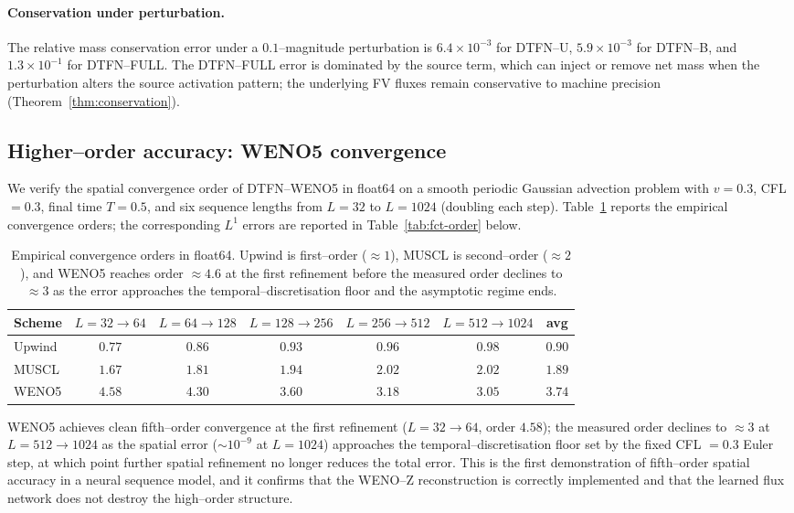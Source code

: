\documentclass[10pt]{article}
\theoremstyle{definition}
\theoremstyle{remark}
\begin{document}
\paragraph{Conservation under perturbation.}  The relative mass
conservation error under a $0.1$--magnitude perturbation is
$6.4 \times 10^{-3}$ for DTFN--U, $5.9 \times 10^{-3}$ for DTFN--B,
and $1.3 \times 10^{-1}$ for DTFN--FULL.  The DTFN--FULL error is
dominated by the source term, which can inject or remove net mass
when the perturbation alters the source activation pattern; the
underlying FV fluxes remain conservative to machine precision
(Theorem~\ref{thm:conservation}).

\subsection{Higher--order accuracy: WENO5 convergence}
\label{sec:exp-weno5}

We verify the spatial convergence order of DTFN--WENO5 in float64 on a
smooth periodic Gaussian advection problem with $v = 0.3$, CFL
$= 0.3$, final time $T = 0.5$, and six sequence lengths from
$L=32$ to $L=1024$ (doubling each step).
Table~\ref{tab:weno5-order}
reports the empirical convergence orders; the corresponding $L^1$
errors are reported in Table~\ref{tab:fct-order} below.

\begin{table}[h]
  \centering
  \caption{Empirical convergence orders in float64.  Upwind is
    first--order ($\approx 1$), MUSCL is second--order ($\approx 2$),
    and WENO5 reaches order $\approx 4.6$ at the first refinement
    before the measured order declines to $\approx 3$ as the error
    approaches the temporal--discretisation floor and the asymptotic
    regime ends.}
  \label{tab:weno5-order}
  \begin{tabular}{lcccccc}
    \toprule
    Scheme & $L{=}32{\to}64$ & $L{=}64{\to}128$ & $L{=}128{\to}256$ & $L{=}256{\to}512$ & $L{=}512{\to}1024$ & avg \\
    \midrule
    Upwind  & $0.77$ & $0.86$ & $0.93$ & $0.96$ & $0.98$ & $0.90$ \\
    MUSCL   & $1.67$ & $1.81$ & $1.94$ & $2.02$ & $2.02$ & $1.89$ \\
    WENO5   & $4.58$ & $4.30$ & $3.60$ & $3.18$ & $3.05$ & $3.74$ \\
    \bottomrule
  \end{tabular}
\end{table}

WENO5 achieves clean fifth--order convergence at the first
refinement ($L{=}32 \to 64$, order $4.58$); the measured order
declines to $\approx 3$ at $L{=}512\to 1024$ as the spatial error
($\sim 10^{-9}$ at $L=1024$) approaches the temporal--discretisation
floor set by the fixed CFL $= 0.3$ Euler step, at which point further
spatial refinement no longer reduces the total error.  This is the
first demonstration of fifth--order spatial accuracy in a neural
sequence model, and it confirms that the WENO--Z reconstruction is
correctly implemented and that the learned flux network does not
destroy the high--order structure.
\end{document}

